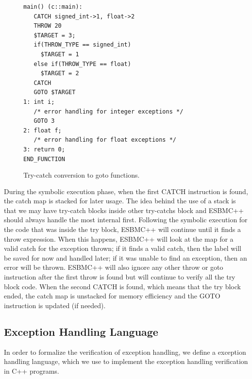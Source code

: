 \documentclass[a4paper]{llncs}
\begin{document}
{\begin{figure}[ht]
\centering
\begin{minipage}{1.0\textwidth}
\begin{lstlisting}
main() (c::main):
   CATCH signed_int->1, float->2
   THROW 20
   $TARGET = 3;
   if(THROW_TYPE == signed_int)
     $TARGET = 1
   else if(THROW_TYPE == float)
     $TARGET = 2
   CATCH
   GOTO $TARGET
1: int i;
   /* error handling for integer exceptions */
   GOTO 3
2: float f;
   /* error handling for float exceptions */
3: return 0;
END_FUNCTION
\end{lstlisting}
\end{minipage}
\caption{Try-catch conversion to goto functions.}
\label{figure:try-catch-goto}
\end{figure}

During the symbolic execution phase, when the first
CATCH instruction is found, the catch map is stacked
for later usage. The idea behind the use of a stack is
that we may have try-catch blocks inside other
try-catchs block and ESBMC++ should always handle
the most internal first. Following the symbolic execution
for the code that was inside the try block, ESBMC++ will continue
until it finds a throw expression. When this happens, ESBMC++ will
look at the map for a valid catch for the exception thrown; if it finds
a valid catch, then the label will be saved for now and handled later;
if it was unable to find an exception, then an error will be thrown.
ESBMC++ will also ignore any other throw or goto instruction after
the first throw is found but will continue to verify all the try
block code. When the second CATCH is found, which means that the try
block ended, the catch map is unstacked for memory efficiency
and the GOTO instruction is updated (if needed).

\subsection{Exception Handling Language}

In order to formalize the verification of exception handling, we
define a exception handling language, which we use to implement
the exception handling verification in C++ programs.

}
\end{document}
